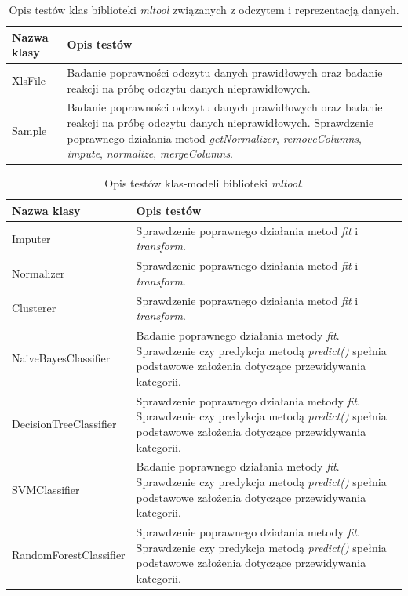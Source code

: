 \documentclass[../thesis.tex]{subfiles}
\begin{document}
\begin{table}[h]
\begin{center}
\begin{tabular}{ | l | p{110mm} | }
\hline
\rowcolor{lightgray} Nazwa klasy & Opis testów \\\hline

XlsFile & Badanie poprawności odczytu danych prawidłowych oraz badanie reakcji na próbę odczytu danych nieprawidłowych. \\\hline
Sample & Badanie poprawności odczytu danych prawidłowych oraz badanie reakcji na próbę odczytu danych nieprawidłowych. Sprawdzenie poprawnego działania metod \emph{getNormalizer}, \emph{removeColumns}, \emph{impute}, \emph{normalize}, \emph{mergeColumns}.\\\hline

\end{tabular}
\caption{Opis testów klas biblioteki \emph{mltool} związanych z odczytem i reprezentacją danych.}
\label{proj:table_mltool_input}
\end{center}
\end{table}

\begin{table}[h]
\begin{center}
\begin{tabular}{ | l | p{110mm} | }
\hline
\rowcolor{lightgray} Nazwa klasy & Opis testów \\\hline

Imputer & Sprawdzenie poprawnego działania metod \emph{fit} i \emph{transform}.\\\hline
Normalizer & Sprawdzenie poprawnego działania metod \emph{fit} i \emph{transform}.\\\hline
Clusterer & Sprawdzenie poprawnego działania metod \emph{fit} i \emph{transform}.\\\hline
NaiveBayesClassifier & Badanie poprawnego działania metody \emph{fit}. Sprawdzenie czy predykcja metodą \emph{predict()} spełnia podstawowe założenia dotyczące przewidywania kategorii.\\\hline
DecisionTreeClassifier & Sprawdzenie poprawnego działania metody \emph{fit}. Sprawdzenie czy predykcja metodą \emph{predict()} spełnia podstawowe założenia dotyczące przewidywania kategorii.\\\hline
SVMClassifier & Badanie poprawnego działania metody \emph{fit}. Sprawdzenie czy predykcja metodą \emph{predict()} spełnia podstawowe założenia dotyczące przewidywania kategorii.\\\hline
RandomForestClassifier & Sprawdzenie poprawnego działania metody \emph{fit}. Sprawdzenie czy predykcja metodą \emph{predict()} spełnia podstawowe założenia dotyczące przewidywania kategorii.\\\hline

\end{tabular}
\caption{Opis testów klas-modeli biblioteki \emph{mltool}.}
\label{proj:table_mltool_models}
\end{center}
\end{table}
\end{document}
